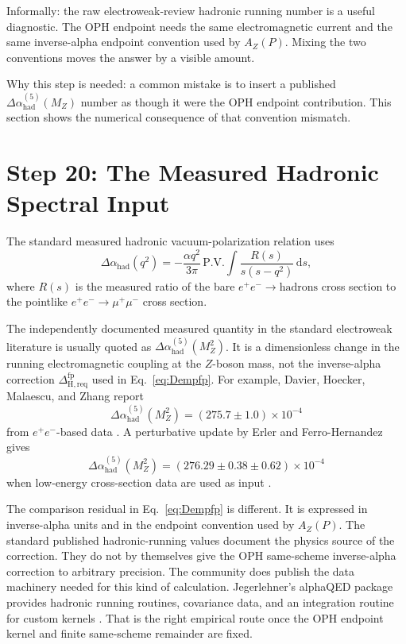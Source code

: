 \documentclass[11pt]{article}
\theoremstyle{remark}
\newcommand{\dd}{\,\mathrm d}
\newcommand{\AZ}{A_Z}
\newcommand{\Dhadreq}{\Delta_{\mathrm{H,req}}}
\begin{document}
Informally: the raw electroweak-review hadronic running number is a useful diagnostic. The OPH endpoint needs the same electromagnetic current and the same inverse-alpha endpoint convention used by \(\AZ(P)\). Mixing the two conventions moves the answer by a visible amount.

Why this step is needed: a common mistake is to insert a published \(\Delta\alpha_{\mathrm{had}}^{(5)}(M_Z)\) number as though it were the OPH endpoint contribution. This section shows the numerical consequence of that convention mismatch.

\section{Step 20: The Measured Hadronic Spectral Input}

The standard measured hadronic vacuum-polarization relation uses
\begin{equation}
\Delta\alpha_{\mathrm{had}}(q^2)
=
-\frac{\alpha q^2}{3\pi}\,
\mathrm{P.V.}\!\int \frac{R(s)}{s(s-q^2)}\dd s,
\label{eq:dispersion}
\end{equation}
where \(R(s)\) is the measured ratio of the bare \(e^+e^-\to\mathrm{hadrons}\) cross section to the pointlike \(e^+e^-\to\mu^+\mu^-\) cross section.

The independently documented measured quantity in the standard electroweak literature is usually quoted as \(\Delta\alpha_{\mathrm{had}}^{(5)}(M_Z^2)\). It is a dimensionless change in the running electromagnetic coupling at the \(Z\)-boson mass, not the inverse-alpha correction \(\Dhadreq^{\mathrm{fp}}\) used in Eq.~\eqref{eq:Dempfp}. For example, Davier, Hoecker, Malaescu, and Zhang report
\[
\Delta\alpha_{\mathrm{had}}^{(5)}(M_Z^2)=(275.7\pm1.0)\times10^{-4}
\]
from \(e^+e^-\)-based data \cite{dhmz}. A perturbative update by Erler and Ferro-Hernandez gives
\[
\Delta\alpha_{\mathrm{had}}^{(5)}(M_Z^2)
=\left(276.29\pm0.38\pm0.62\right)\times10^{-4}
\]
when low-energy cross-section data are used as input \cite{erler-ferro}.

The comparison residual in Eq.~\eqref{eq:Dempfp} is different. It is expressed in inverse-alpha units and in the endpoint convention used by \(\AZ(P)\). The standard published hadronic-running values document the physics source of the correction. They do not by themselves give the OPH same-scheme inverse-alpha correction to arbitrary precision. The community does publish the data machinery needed for this kind of calculation. Jegerlehner's alphaQED package provides hadronic running routines, covariance data, and an integration routine for custom kernels \cite{alphaqed}. That is the right empirical route once the OPH endpoint kernel and finite same-scheme remainder are fixed.
\end{document}
